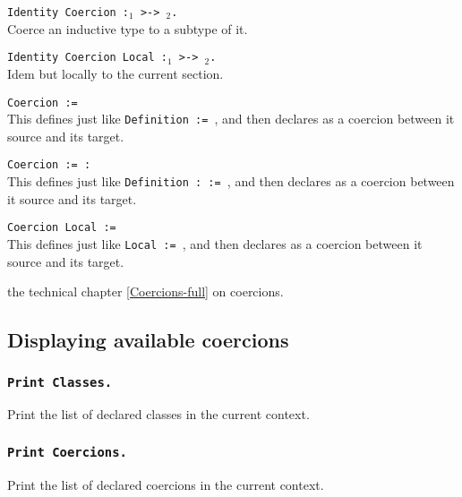 {\begin{coq_example}
\begin{Variants}
\item {\tt Identity Coercion {\ident}:{\ident$_1$} >->
    {\ident$_2$}.}\\
Coerce an inductive type to a subtype of it.

\item {\tt Identity Coercion Local {\ident}:{\ident$_1$} >-> {\ident$_2$}.} \\
Idem but locally to the current section.

\item {\tt Coercion {\ident} := {\term}}\\
  This defines {\ident} just like \texttt{Definition {\ident} :=
    {\term}}, and then declares {\ident} as a coercion between it
  source and its target.

\item {\tt Coercion {\ident} := {\term} : {\type}}\\
  This defines {\ident} just like 
  \texttt{Definition {\ident} : {\type} := {\term}}, and then
  declares {\ident} as a coercion between it source and its target. 

\item {\tt Coercion Local {\ident} := {\term}}\\
  This defines {\ident} just like \texttt{Local {\ident} :=
    {\term}}, and then declares {\ident} as a coercion between it
  source and its target.

\end{Variants}

\SeeAlso the technical chapter \ref{Coercions-full} on coercions.

\subsection{Displaying available coercions}

\subsubsection{\tt Print Classes.}
Print the list of declared classes in the current context.

\subsubsection{\tt Print Coercions.}
Print the list of declared coercions in the current context.


\end{coq_example}}
